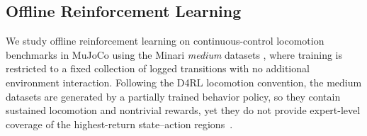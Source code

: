 \documentclass{article}
\theoremstyle{plain}
\theoremstyle{definition}
\theoremstyle{remark}
\begin{document}
\newcommand{\best}[1]{\cellcolor{green!12}\textbf{#1}}


\subsection{Offline Reinforcement Learning}

We study offline reinforcement learning on continuous-control locomotion benchmarks in MuJoCo \cite{todorov2012mujoco} using the Minari \emph{medium} datasets \cite{minari}, where training is restricted to a fixed collection of logged transitions with no additional environment interaction.  {Following the D4RL locomotion convention, the medium datasets are generated by a partially trained behavior policy, so they contain sustained locomotion and nontrivial rewards, yet they do not provide expert-level coverage of the highest-return state--action regions}~\cite{fu2020d4rl}.
\end{document}
